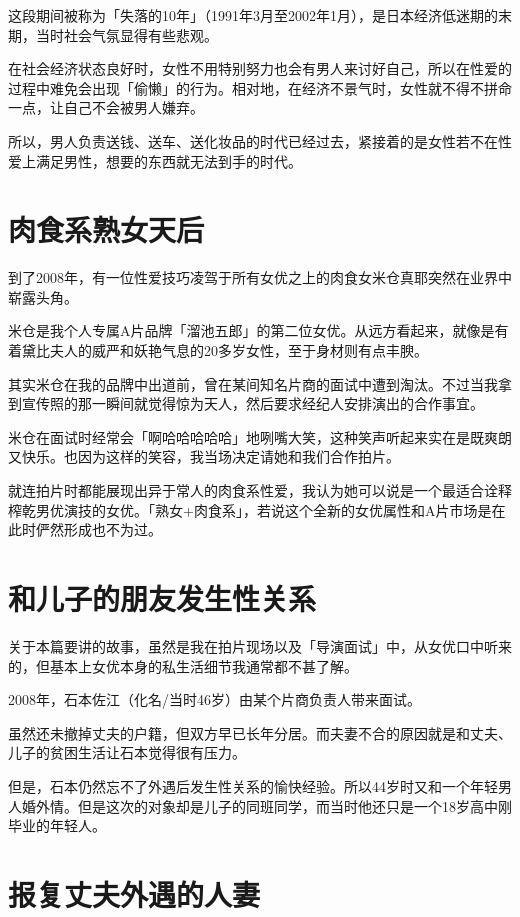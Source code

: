 \documentclass[12pt,UTF8]{ctexbook}
\begin{document}
这段期间被称为「失落的10年」（1991年3月至2002年1月），是日本经济低迷期的末期，当时社会气氛显得有些悲观。

在社会经济状态良好时，女性不用特别努力也会有男人来讨好自己，所以在性爱的过程中难免会出现「偷懒」的行为。相对地，在经济不景气时，女性就不得不拼命一点，让自己不会被男人嫌弃。

所以，男人负责送钱、送车、送化妆品的时代已经过去，紧接着的是女性若不在性爱上满足男性，想要的东西就无法到手的时代。

\section{肉食系熟女天后}

到了2008年，有一位性爱技巧凌驾于所有女优之上的肉食女米仓真耶突然在业界中崭露头角。

米仓是我个人专属A片品牌「溜池五郎」的第二位女优。从远方看起来，就像是有着黛比夫人的威严和妖艳气息的20多岁女性，至于身材则有点丰腴。

其实米仓在我的品牌中出道前，曾在某间知名片商的面试中遭到淘汰。不过当我拿到宣传照的那一瞬间就觉得惊为天人，然后要求经纪人安排演出的合作事宜。

米仓在面试时经常会「啊哈哈哈哈哈」地咧嘴大笑，这种笑声听起来实在是既爽朗又快乐。也因为这样的笑容，我当场决定请她和我们合作拍片。

就连拍片时都能展现出异于常人的肉食系性爱，我认为她可以说是一个最适合诠释榨乾男优演技的女优。「熟女+肉食系」，若说这个全新的女优属性和A片市场是在此时俨然形成也不为过。

\section{和儿子的朋友发生性关系}

关于本篇要讲的故事，虽然是我在拍片现场以及「导演面试」中，从女优口中听来的，但基本上女优本身的私生活细节我通常都不甚了解。

2008年，石本佐江（化名/当时46岁）由某个片商负责人带来面试。

虽然还未撤掉丈夫的户籍，但双方早已长年分居。而夫妻不合的原因就是和丈夫、儿子的贫困生活让石本觉得很有压力。

但是，石本仍然忘不了外遇后发生性关系的愉快经验。所以44岁时又和一个年轻男人婚外情。但是这次的对象却是儿子的同班同学，而当时他还只是一个18岁高中刚毕业的年轻人。

\section{报复丈夫外遇的人妻}
\end{document}
